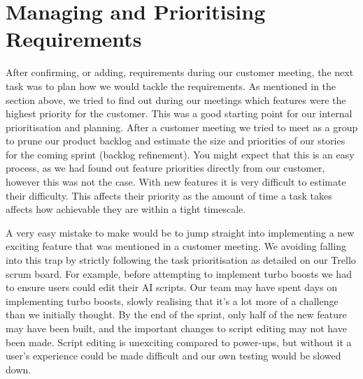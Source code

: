 \section{Managing and Prioritising Requirements}
After confirming, or adding, requirements during our customer meeting, the next task was to plan how we would tackle the requirements. As mentioned in the section above, we tried to find out during our meetings which features were the highest priority for the customer. This was a good starting point for our internal prioritisation and planning. After a customer meeting we tried to meet as a group to prune our product backlog and estimate the size and priorities of our stories for the coming sprint (backlog refinement). You might expect that this is an easy process, as we had found out feature priorities directly from our customer, however this was not the case. With new features it is very difficult to estimate their difficulty. This affects their priority as the amount of time a task takes affects how achievable they are within a tight timescale. 

A very easy mistake to make would be to jump straight into implementing a new exciting feature that was mentioned in a customer meeting. We avoiding falling into this trap by strictly following the task prioritisation as detailed on our Trello scrum board. For example, before attempting to implement turbo boosts we had to ensure users could edit their AI scripts. Our team may have spent days on implementing turbo boosts, slowly realising that it's a lot more of a challenge than we initially thought. By the end of the sprint, only half of the new feature may have been built, and the important changes to script editing may not have been made. Script editing is unexciting compared to power-ups, but without it a user's experience could be made difficult and our own testing would be slowed down.

